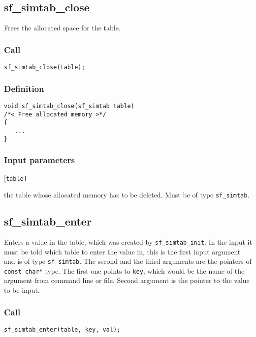 \subsection{{sf\_simtab\_close}}\label{sec:sf_simtab_close}
Frees the allocated space for the table.

\subsubsection*{Call}
\begin{verbatim}sf_simtab_close(table);\end{verbatim}

\subsubsection*{Definition}
\begin{verbatim}
void sf_simtab_close(sf_simtab table)
/*< Free allocated memory >*/
{
   ...
}
\end{verbatim}

\subsubsection*{Input parameters}
\begin{desclist}{\tt }{\quad}[\tt table]
   \setlength\itemsep{0pt}
   \item[table] the table whose allocated memory has to be deleted. Must be of type \texttt{sf\_simtab}.
\end{desclist}




\subsection{{sf\_simtab\_enter}}\label{sec:sf_simtab_enter}
Enters a value in the table, which was created by \texttt{sf\_simtab\_init}. In the input it must be told which table to enter the value in, this is the first input argument and is of type \texttt{sf\_simtab}. The second and the third arguments are the pointers of \texttt{const char*} type. The first one points to \texttt{key}, which would be the name of the argument from command line or file. Second argument is the pointer to the value to be input.

\subsubsection*{Call}
\begin{verbatim}sf_simtab_enter(table, key, val);\end{verbatim}

